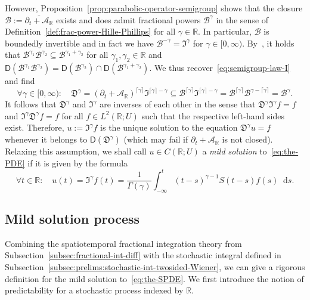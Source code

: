 \documentclass[reqno]{amsart}
\numberwithin{equation}{section}
\newcommand{\bbR}{\mathbb{R}}
\newcommand{\R}{\mathbb{R}}
\newcommand{\cA}{\mathcal{A}}
\newcommand{\cB}{\mathcal{B}}
\newcommand{\rd}{\mathop{}\!\mathrm{d}}
\newcommand{\clos}[1]{\overline{ #1 }}
\newcommand{\dom}[1]{\mathsf D(#1)}
\theoremstyle{remark}
\theoremstyle{definition}
\begin{document}
However, Proposition~\ref{prop:parabolic-operator-semigroup} shows that
the closure $\cB := \clos{\partial_t + \cA_\R}$ exists and does admit
fractional powers $\cB^\gamma$ in the sense of Definition~\ref{def:frac-power-Hille-Phillips}
for all $\gamma \in \R$. In particular, $\cB$ is boundedly invertible and in fact
we have $\cB^{-\gamma} = \mathfrak I^\gamma$ for $\gamma \in [0,\infty)$.
By~\cite[Proposition~3.2.1(b)]{Haase2006}, 
it holds that $\cB^{\gamma_1} \cB^{\gamma_2} \subseteq \cB^{\gamma_1 + \gamma_2}$
for all $\gamma_1, \gamma_2 \in \R$ and $\dom{\cB^{\gamma_1} \cB^{\gamma_2}} = \dom{\cB^{\gamma_2}} \cap \dom{\cB^{\gamma_1 + \gamma_2}}$.
We thus recover~\eqref{eq:semigroup-law-I} and find
%
\[
\forall \gamma \in [0,\infty) : \quad 
\mathfrak D^\gamma 
=
(\partial_t + \cA_\R)^{\lceil \gamma \rceil} \mathfrak I^{\lceil \gamma \rceil - \gamma}
\subseteq 
\cB^{\lceil \gamma \rceil} \mathfrak I^{\lceil \gamma \rceil - \gamma}
=
\cB^{\lceil \gamma \rceil} \cB^{\gamma - \lceil \gamma \rceil}
=
\cB^\gamma.
\]
% 
It follows that $\mathfrak D^\gamma$ and
$\mathfrak I^\gamma$ are inverses of each other 
in the sense that $\mathfrak D^\gamma \mathfrak I^\gamma f = f$ 
and $\mathfrak I^\gamma \mathfrak D^\gamma f = f$ 
for all $f \in L^2(\R; U)$ such that the respective left-hand sides exist.
Therefore, $u := \mathfrak I^\gamma f$
is the unique solution to the equation $\mathfrak D^\gamma u = f$
whenever it belongs to $\dom{\mathfrak D^\gamma}$ (which may fail if $\partial_t + \cA_\bbR$ is not closed).
Relaxing this assumption, we shall call $u \in C(\R; U)$
a \emph{mild solution} to~\eqref{eq:the-PDE} if it is given by the formula
%
\begin{equation}
	\forall t \in \R : \quad 
	u(t) = \mathfrak I^\gamma f(t) = \frac{1}{\Gamma(\gamma)} \int_{-\infty}^t (t-s)^{\gamma-1} S(t-s) f(s) \rd s.
\end{equation}
%

\subsection{Mild solution process}
\label{subsec:mildsol}
Combining the spatiotemporal fractional integration theory from Subsection~\ref{subsec:fractional-int-diff}
with the stochastic integral defined in Subsection~\ref{subsec:prelims:stochastic-int-twosided-Wiener},
we can give a rigorous definition for the mild solution to~\eqref{eq:the-SPDE}.
We first introduce the notion of predictability for a stochastic process indexed by $\bbR$.
\end{document}
